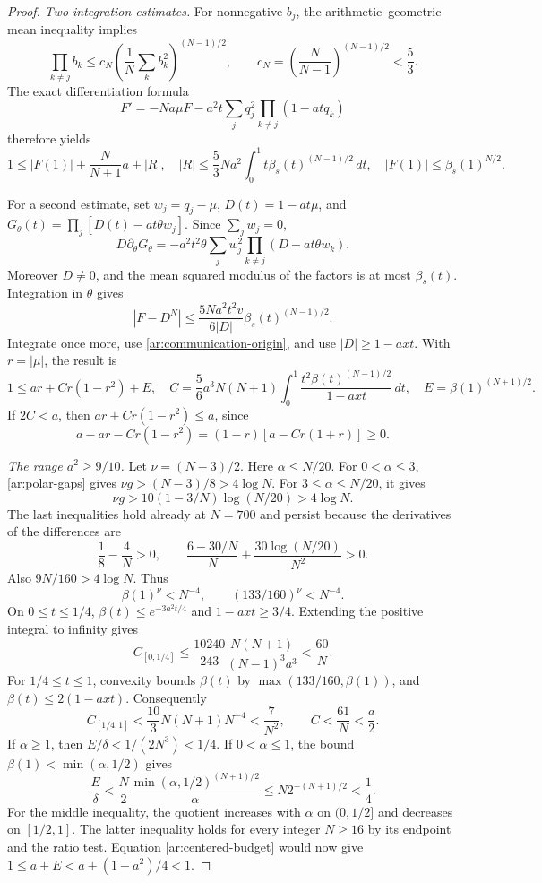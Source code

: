 \begin{proof}
\smallskip
\noindent\emph{Two integration estimates.}
For nonnegative $b_j$, the arithmetic--geometric mean inequality implies
\[
 \prod_{k\ne j}b_k
 \le c_N\left(\frac1N\sum_kb_k^2\right)^{(N-1)/2},
 \qquad c_N=\left(\frac N{N-1}\right)^{(N-1)/2}<\frac53.
\]
The exact differentiation formula
\[
 F'=-Na\mu F-a^2t\sum_jq_j^2\prod_{k\ne j}(1-atq_k)
\]
therefore yields
\begin{equation}\label{ar:direct-budget}
 1\le |F(1)|+\frac N{N+1}a+|R|,
 \quad
 |R|\le\frac53Na^2\int_0^1t\beta_s(t)^{(N-1)/2}\,dt,
 \quad |F(1)|\le\beta_s(1)^{N/2}.
\end{equation}

For a second estimate, set $w_j=q_j-\mu$, $D(t)=1-at\mu$, and
$G_\theta(t)=\prod_j[D(t)-at\theta w_j]$.  Since $\sum_jw_j=0$,
\[
 D\partial_\theta G_\theta
 =-a^2t^2\theta\sum_jw_j^2\prod_{k\ne j}(D-at\theta w_k).
\]
Moreover $D\ne0$, and the mean squared modulus of the factors is at
most $\beta_s(t)$. Integration in $\theta$ gives
\[
 |F-D^N|\le\frac{5Na^2t^2v}{6|D|}\beta_s(t)^{(N-1)/2}.
\]
Integrate once more, use \eqref{ar:communication-origin}, and use
$|D|\ge1-axt$. With $r=|\mu|$, the result is
\begin{equation}\label{ar:centered-budget}
 1\le ar+C r(1-r^2)+E,
 \quad
 C=\frac56a^3N(N+1)\int_0^1
       \frac{t^2\beta(t)^{(N-1)/2}}{1-axt}\,dt,
 \quad E=\beta(1)^{(N+1)/2}.
\end{equation}
If $2C<a$, then $ar+Cr(1-r^2)\le a$, since
\[
 a-ar-Cr(1-r^2)=(1-r)[a-Cr(1+r)]\ge0.
\]

\smallskip
\noindent\emph{The range $a^2\ge9/10$.}
Let $\nu=(N-3)/2$. Here $\alpha\le N/20$.
For $0<\alpha\le3$, \eqref{ar:polar-gaps} gives
$\nu g>(N-3)/8>4\log N$.
For $3\le\alpha\le N/20$, it gives
\[
 \nu g>10(1-3/N)\log(N/20)>4\log N.
\]
The last inequalities hold already at $N=700$ and persist because the
derivatives of the differences are
\[
 \frac18-\frac4N>0,\qquad
 \frac{6-30/N}{N}+\frac{30\log(N/20)}{N^2}>0.
\]
Also $9N/160>4\log N$. Thus
\[
 \beta(1)^\nu<N^{-4},\qquad (133/160)^\nu<N^{-4}.
\]
On $0\le t\le1/4$,
$\beta(t)\le e^{-3a^2t/4}$ and $1-axt\ge3/4$.
Extending the positive integral to infinity gives
\[
 C_{[0,1/4]}
 \le\frac{10240}{243}\frac{N(N+1)}{(N-1)^3a^3}<\frac{60}{N}.
\]
For $1/4\le t\le1$, convexity bounds $\beta(t)$ by
$\max(133/160,\beta(1))$, and $\beta(t)\le2(1-axt)$.
Consequently
\[
 C_{[1/4,1]}<\frac{10}{3}N(N+1)N^{-4}<\frac7{N^2},
 \qquad C<\frac{61}{N}<\frac a2.
\]
If $\alpha\ge1$, then $E/\delta<1/(2N^3)<1/4$.
If $0<\alpha\le1$, the bound
$\beta(1)<\min(\alpha,1/2)$ gives
\[
 \frac E\delta<\frac N2
 \frac{\min(\alpha,1/2)^{(N+1)/2}}\alpha
 \le N2^{-(N+1)/2}<\frac14.
\]
For the middle inequality, the quotient increases with $\alpha$
on $(0,1/2]$ and decreases on $[1/2,1]$.
The latter inequality holds for every integer $N\ge16$ by its endpoint
and the ratio test. Equation \eqref{ar:centered-budget} would now give
$1\le a+E<a+(1-a^2)/4<1$.


\end{proof}
